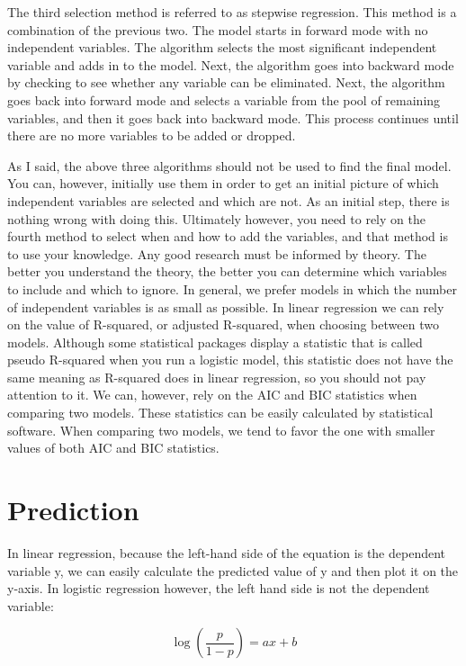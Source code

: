 \documentclass[a4paper,12pt,oneside]{book}
\begin{document}
The third selection method is referred to as stepwise regression. This method is a combination of the previous two. The model starts in forward mode with no independent variables. The algorithm selects the most 
significant independent variable and adds in to the model. Next, the algorithm goes into backward mode by checking to see whether any variable can be eliminated. Next, the algorithm goes back into forward mode 
and selects a variable from the pool of remaining variables, and then it goes back into backward mode. This process continues until there are no more variables to be added or dropped.

As I said, the above three algorithms should not be used to find the final model. You can, however, initially use them in order to get an initial picture of which independent variables are selected and which are not. 
As an initial step, there is nothing wrong with doing this. Ultimately however, you need to rely on the fourth method to select when and how to add the variables, and that method is to use your knowledge. Any good 
research must be informed by theory. The better you understand the theory, the better you can determine which variables to include and which to ignore. In general, we prefer models in which the number of independent 
variables is as small as possible. In linear regression we can rely on the value of R-squared, or adjusted R-squared, when choosing between two models. Although some statistical packages display a statistic that is 
called pseudo R-squared when you run a logistic model, this statistic does not have the same meaning as R-squared does in linear regression, so you should not pay attention to it. We can, however, rely on the AIC and 
BIC statistics when comparing two models. These statistics can be easily calculated by statistical software. When comparing two models, we tend to favor the one with smaller values of both AIC and BIC statistics.

\section{Prediction}
In linear regression, because the left-hand side of the equation is the dependent variable y, we can easily calculate the predicted value of y and then plot it on the y-axis. In logistic regression however, 
the left hand side is not the dependent variable:

$$ \log(\frac{p}{1-p})=ax+b $$
\end{document}
